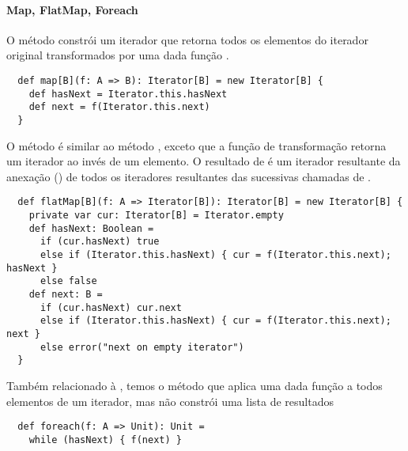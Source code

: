 \paragraph{Map, FlatMap, Foreach} O método  
constrói um iterador que retorna todos os elementos do iterador original transformados por uma dada função .
\begin{lstlisting}
  def map[B](f: A => B): Iterator[B] = new Iterator[B] {
    def hasNext = Iterator.this.hasNext
    def next = f(Iterator.this.next)
  }
\end{lstlisting}
O método  é similar ao método , exceto que a função de transformação  retorna um iterador 
ao invés de um elemento. O resultado de  é um iterador resultante da anexação () de todos os iteradores resultantes
das sucessivas chamadas de .
\begin{lstlisting}
  def flatMap[B](f: A => Iterator[B]): Iterator[B] = new Iterator[B] {
    private var cur: Iterator[B] = Iterator.empty
    def hasNext: Boolean =
      if (cur.hasNext) true
      else if (Iterator.this.hasNext) { cur = f(Iterator.this.next); hasNext }
      else false
    def next: B =
      if (cur.hasNext) cur.next
      else if (Iterator.this.hasNext) { cur = f(Iterator.this.next); next }
      else error("next on empty iterator")
  }
\end{lstlisting}
Também relacionado à , temos o método  que aplica uma
dada função a todos elementos de um iterador, mas não constrói uma lista de resultados
\begin{lstlisting}
  def foreach(f: A => Unit): Unit =
    while (hasNext) { f(next) }
\end{lstlisting}

